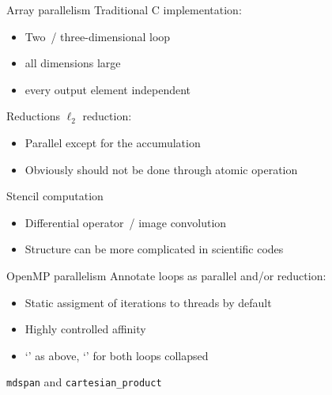 \documentclass[10pt]{beamer}
\begin{document}
\begin{frame}[containsverbatim]{Array parallelism}
  Traditional C implementation:
  
  \begin{itemize}
  \item Two~/ three-dimensional loop
  \item all dimensions large
  \item every output element independent
  \end{itemize}
\end{frame}

\begin{frame}[containsverbatim]{Reductions}
  $\ell_2$ reduction:%
  \begin{itemize}
  \item Parallel except for the accumulation
  \item Obviously should not be done through atomic operation
  \end{itemize}
\end{frame}

\begin{frame}[containsverbatim]{Stencil computation}
  \begin{itemize}
  \item Differential operator~/ image convolution
  \item Structure can be more complicated in scientific codes
  \end{itemize}
\end{frame}

\begin{frame}[containsverbatim]{OpenMP parallelism}
  Annotate loops as parallel and/or reduction:
  \begin{itemize}
  \item Static assigment of iterations to threads by default
  \item Highly controlled affinity
  \item `' as above, `' for both loops collapsed
  \end{itemize}
\end{frame}

\begin{frame}[containsverbatim]{\texttt{mdspan} and \texttt{cartesian\_product}}
  \hbox\bgroup
  \egroup
\end{frame}
\end{document}
